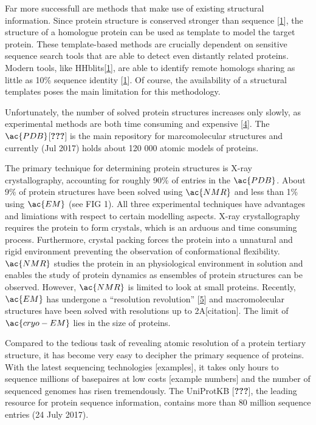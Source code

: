 \documentclass[12pt,a4paper,twoside]{book}
\theoremstyle{definition}
\theoremstyle{definition}
\theoremstyle{remark}
\begin{document}
Far more successfull are methods that make use of existing structural
information. Since protein structure is conserved stronger than sequence
{[}\protect\hyperlink{ref-Anfinsen1973}{1}{]}, the structure of a
homologue protein can be used as template to model the target protein.
These template-based methods are crucially dependent on sensitive
sequence search tools that are able to detect even distantly related
proteins. Modern tools, like
HHblits{[}\protect\hyperlink{ref-Anfinsen1973}{1}{]}, are able to
identify remote homologs sharing as little as 10\% sequence identity
{[}\protect\hyperlink{ref-Anfinsen1973}{1}{]}. Of course, the
availability of a structural templates poses the main limitation for
this methodology.

Unfortunately, the number of solved protein structures increases only
slowly, as experimental methods are both time consuming and expensive
{[}\protect\hyperlink{ref-Dorn2014}{4}{]}. The
\(\ac{PDB}\){[}{\textbf{???}}{]} is the main repository for
marcomolecular structures and currently (Jul 2017) holds about 120 000
atomic models of proteins.

The primary technique for determining protein structures is X-ray
crystallography, accounting for roughly 90\% of entries in the
\(\ac{PDB}\). About 9\% of protein structures have been solved using
\(\ac{NMR}\) and less than 1\% using \(\ac{EM}\) (see FIG 1). All three
experimental techniques have advantages and limiations with respect to
certain modelling aspects. X-ray crystallography requires the protein to
form crystals, which is an arduous and time consuming process.
Furthermore, crystal packing forces the protein into a unnatural and
rigid environment preventing the observation of conformational
flexibility. \(\ac{NMR}\) studies the protein in an physiological
environment in solution and enables the study of protein dynamics as
ensembles of protein structures can be observed. However, \(\ac{NMR}\)
is limited to look at small proteins. Recently, \(\ac{EM}\) has
undergone a ``resolution revolution''
{[}\protect\hyperlink{ref-Egelman2016}{5}{]} and macromolecular
structures have been solved with resolutions up to 2A{[}citation{]}. The
limit of \(\ac{cryo-EM}\) lies in the size of proteins.

Compared to the tedious task of revealing atomic resolution of a protein
tertiary structure, it has become very easy to decipher the primary
sequence of proteins. With the latest sequencing technologies
{[}examples{]}, it takes only hours to sequence millions of basepaires
at low costs {[}example numbers{]} and the number of sequenced genomes
has risen tremendously. The UniProtKB {[}{\textbf{???}}{]}, the leading
resource for protein sequence information, contains more than 80 million
sequence entries (24 July 2017).
\end{document}
